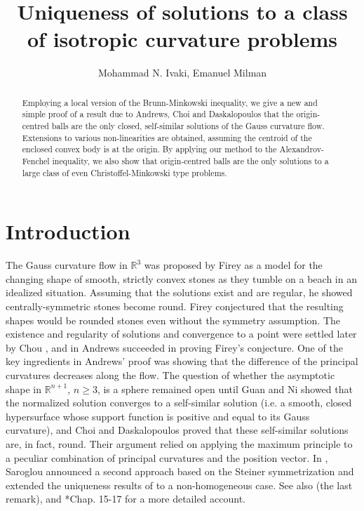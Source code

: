 \documentclass[12pt]{amsart}
\theoremstyle{definition}
\numberwithin{equation}{section}
\theoremstyle{remark}
\numberwithin{equation}{section}
\begin{document}
\title[Uniqueness of solutions]
 {Uniqueness of solutions to a class of isotropic curvature problems}
\author[]{Mohammad N. Ivaki, Emanuel Milman}
\dedicatory{}
\begingroup    \renewcommand{\thefootnote}{}    
\endgroup
\begin{abstract}
Employing a local version of the Brunn-Minkowski inequality,
we give a new and simple proof of a result due to Andrews, Choi and Daskalopoulos that the origin-centred balls are the only closed, self-similar solutions of the Gauss curvature flow. Extensions to various non-linearities are obtained, assuming the centroid of the enclosed convex body is at the origin. By applying our method to the Alexandrov-Fenchel inequality, we also show that origin-centred balls are the only solutions to a large class of even Christoffel-Minkowski type problems.
\end{abstract}
\maketitle
\section{Introduction}
The Gauss curvature flow in $\mathbb{R}^3$ was proposed by Firey \cite{Fir74} as a model for the changing shape of smooth, strictly convex stones as they tumble on a beach in an idealized situation. Assuming that the solutions exist and are regular, he showed centrally-symmetric stones become round. Firey conjectured that the resulting shapes would be rounded stones even without the symmetry assumption. The existence and regularity of solutions and convergence to a point were settled later by Chou \cite{Tso85}, and in \cite{And99} Andrews succeeded in proving  Firey's conjecture. One of the key ingredients in Andrews' proof was showing that the difference of the principal curvatures decreases along the flow. The question of whether the asymptotic shape in $\mathbb{R}^{n+1}$, $n\geq 3$, is a sphere remained open until Guan and Ni \cite{GN17} showed that the normalized solution converges to a self-similar solution (i.e. a smooth, closed hypersurface whose support function is positive and equal to its Gauss curvature), and Choi and Daskalopoulos \cite{CD16} proved that these self-similar solutions are, in fact, round. Their argument relied on applying the maximum principle to a peculiar combination of principal curvatures and the position vector. In \cite{Sar22}, Saroglou announced a second approach based on the Steiner symmetrization and extended the uniqueness results of \cites{Cho85,And99,AC12,CD16,BCD17} to a non-homogeneous case. See also \cite{McC18} (the last remark), and  \cite{ACGL20}*{Chap. 15-17} for a more detailed account.  
\end{document}
